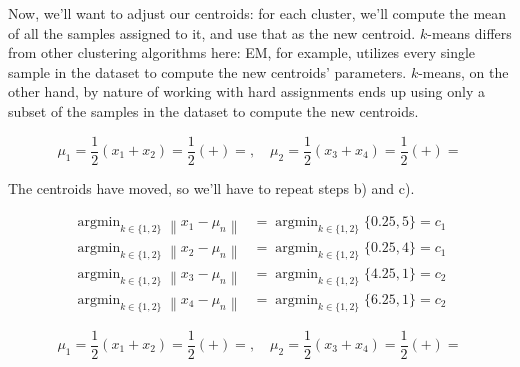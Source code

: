 \documentclass[12pt]{article}
\begin{document}
\begin{enumerate}[leftmargin=\labelsep]
  Now, we'll want to adjust our centroids: for each cluster, we'll compute the mean of all
  the samples assigned to it, and use that as the new centroid. $k$-means differs from
  other clustering algorithms here: EM, for example, utilizes every single sample in the
  dataset to compute the new centroids' parameters. $k$-means, on the other hand, by
  nature of working with hard assignments ends up using only a subset of the samples
  in the dataset to compute the new centroids.

  \begin{equation*}
    \mu_1 = \frac{1}{2} \left( x_1 + x_2 \right) = \frac{1}{2} \left(  +  \right) = , \quad
    \mu_2 = \frac{1}{2} \left( x_3 + x_4 \right) = \frac{1}{2} \left(  +  \right) = 
  \end{equation*}

  The centroids have moved, so we'll have to repeat steps b) and c).

  \begin{equation*}
    \begin{aligned}
      \operatorname{argmin}_{k \in \{1, 2\}} \left\| x_1 - \mu_n \right\| & = \operatorname{argmin}_{k \in \{1, 2\}} \{0.25, 5\} = c_1 \\
      \operatorname{argmin}_{k \in \{1, 2\}} \left\| x_2 - \mu_n \right\| & = \operatorname{argmin}_{k \in \{1, 2\}} \{0.25, 4\} = c_1 \\
      \operatorname{argmin}_{k \in \{1, 2\}} \left\| x_3 - \mu_n \right\| & = \operatorname{argmin}_{k \in \{1, 2\}} \{4.25, 1\} = c_2 \\
      \operatorname{argmin}_{k \in \{1, 2\}} \left\| x_4 - \mu_n \right\| & = \operatorname{argmin}_{k \in \{1, 2\}} \{6.25, 1\} = c_2
    \end{aligned}
  \end{equation*}

  \begin{equation*}
    \mu_1 = \frac{1}{2} \left( x_1 + x_2 \right) = \frac{1}{2} \left(  +  \right) = , \quad
    \mu_2 = \frac{1}{2} \left( x_3 + x_4 \right) = \frac{1}{2} \left(  +  \right) = 
  \end{equation*}


\end{enumerate}
\end{document}
